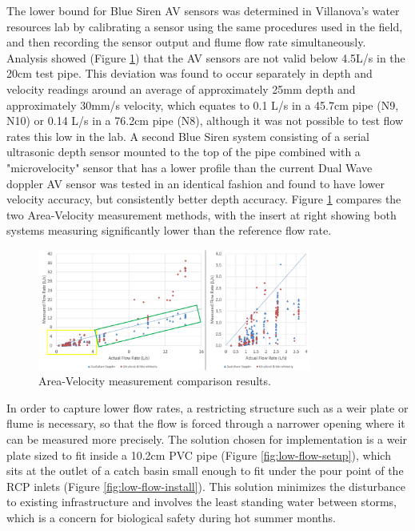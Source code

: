 The lower bound for Blue Siren AV sensors was determined in Villanova's water resources lab by calibrating a sensor using the same procedures used in the field, and then recording the sensor output and flume flow rate simultaneously.
Analysis showed (Figure \ref{fig:av-lab-results}) that the AV sensors are not valid below 4.5L/s in the 20cm test pipe.
This deviation was found to occur separately in depth and velocity readings around an average of approximately 25mm depth and approximately 30mm/s velocity, which equates to 0.1 L/s in a 45.7cm pipe (N9, N10) or 0.14 L/s in a 76.2cm pipe (N8), although it was not possible to test flow rates this low in the lab.
A second Blue Siren system consisting of a serial ultrasonic depth sensor mounted to the top of the pipe combined with a "microvelocity" sensor that has a lower profile than the current Dual Wave doppler AV sensor was tested in an identical fashion and found to have lower velocity accuracy, but consistently better depth accuracy.
Figure \ref{fig:av-lab-results} compares the two Area-Velocity measurement methods, with the insert at right showing both systems measuring significantly lower than the reference flow rate.
\begin{figure}[ht!]
	\centering
	\includegraphics[width=0.8\textwidth]{gfx/chapter-instrumentation/AV-lab-results.png}
	\caption{Area-Velocity measurement comparison results.}
	\label{fig:av-lab-results}
\end{figure}

In order to capture lower flow rates, a restricting structure such as a weir plate or flume is necessary, so that the flow is forced through a narrower opening where it can be measured more precisely.
The solution chosen for implementation is a weir plate sized to fit inside a 10.2cm PVC pipe (Figure \ref{fig:low-flow-setup}), which sits at the outlet of a catch basin small enough to fit under the pour point of the RCP inlets (Figure \ref{fig:low-flow-install}).
This solution minimizes the disturbance to existing infrastructure and involves the least standing water between storms, which is a concern for biological safety during hot summer months.

